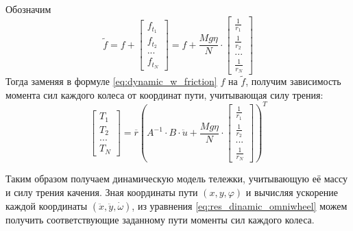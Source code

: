 \documentclass[oneside,final,14pt]{extreport}
\begin{document}
Обозначим 
\begin{equation}
\tilde{f}
=
f
+
\begin{bmatrix}
f_{t_{1}} \\
f_{t_{2}} \\
... \\
f_{t_{N}}
\end{bmatrix}
=
f
+
\frac{Mg\eta}{N}
\cdot
\begin{bmatrix}
\frac{1}{r_{1}} \\
\frac{1}{r_{2}} \\
...       \\
\frac{1}{r_{N}}
\end{bmatrix}
\end{equation}
Тогда заменяя в формуле \ref{eq:dynamic_w_friction} $f$ на $\tilde{f}$, получим зависимость момента сил каждого колеса от координат пути, учитывающая силу трения:
\begin{equation}
\label{eq:res_dinamic_omniwheel}
\begin{bmatrix}
T_{1} \\
T_{2} \\
... \\
T_{N}
\end{bmatrix}
=
\overline{r}
(
A^{-1}
\cdot
B 
\cdot
\ddot{u}
+
\frac{Mg\eta}{N}
\cdot
\begin{bmatrix}
\frac{1}{r_{1}} \\
\frac{1}{r_{2}} \\
...       \\
\frac{1}{r_{N}}
\end{bmatrix}
)^{T}
\end{equation} 

Таким образом получаем динамическую модель тележки, учитывающую её массу и силу трения качения. Зная координаты пути $(x,y,\varphi)$ и вычисляя ускорение каждой координаты $(\ddot{x},\ddot{y},\dot{\omega})$, из уравнения \ref{eq:res_dinamic_omniwheel} можем получить соответствующие заданному пути моменты сил каждого колеса.

\iffalse
В работе ref более детально рассматривается динамическая модель тележки на N роликонесущих колесах.  Модель тележки строится исходя из предположения о том, что модель роликонесущего колеса — твердый диск, скорость наинизшей точки которого перпендикулярна направлению оси ролика в этой точке. Кроме того, рассмотрен критерий управляемости такой модели, из которого следует ряд ограничений на его конструкцию. Например если сумма угла оси ролика и угла поворота колеса всех роликонесущих колес равна, то такая модель не может двигаться по произвольной трактории. Если же эти углы у двух колес совпадают, то пару колес можно принять за одно виртуальное колесо с радиус вектором $r_{ij} = r_{i} - r_{j}$ в локальной системе координат и моментом $T_{ij} = T_{i} + T_{j}$.
\fi
\end{document}
